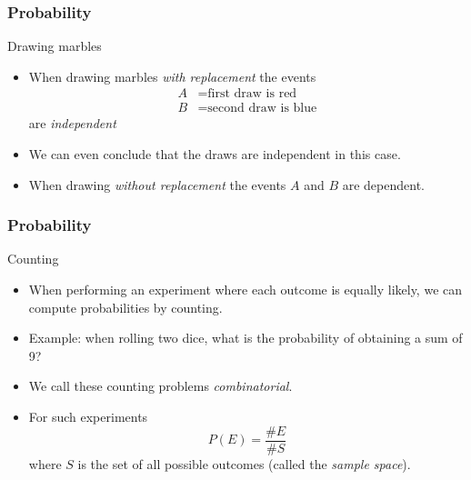 \documentclass[handout]{beamer}
\begin{document}

   \begin{frame} \frametitle{Probability}

   \begin{block}
   {Drawing marbles}
   \begin{itemize}
   \item When drawing marbles {\em with replacement}
   the events
   $$
   \begin{aligned}
   A &= \text{first draw is red} \\
   B &= \text{second draw is blue}
   \end{aligned}
   $$
   are {\em independent}
   \item We can even conclude that the draws are independent in this case.
   \item When drawing {\em without replacement}
   the events $A$ and $B$ are dependent.
   \end{itemize}
   \end{block}
   \end{frame}


   \begin{frame} \frametitle{Probability}

   \begin{block}
   {Counting}
   \begin{itemize}
   \item When performing an experiment where each outcome
   is equally likely, we can compute probabilities by counting.
   \item Example: when rolling two dice, what is the
   probability of obtaining a sum of 9?
   \item We call these counting problems {\em combinatorial}.
   \item For such experiments
   $$
   P(E) = \frac{\# E}{\# S}
   $$
   where $S$ is the set of all possible outcomes (called the {\em sample space}).
   \end{itemize}
   \end{block}
   \end{frame}

\end{document}
